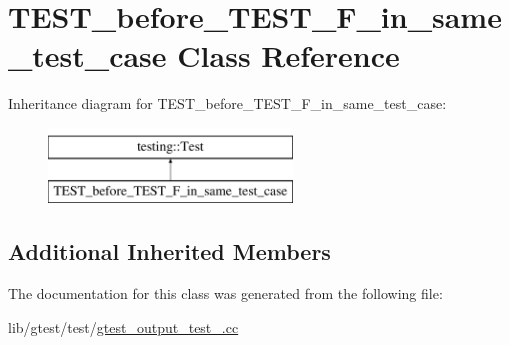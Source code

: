 \hypertarget{class_t_e_s_t__before___t_e_s_t___f__in__same__test__case}{\section{T\-E\-S\-T\-\_\-before\-\_\-\-T\-E\-S\-T\-\_\-\-F\-\_\-in\-\_\-same\-\_\-test\-\_\-case Class Reference}
\label{class_t_e_s_t__before___t_e_s_t___f__in__same__test__case}
}
Inheritance diagram for T\-E\-S\-T\-\_\-before\-\_\-\-T\-E\-S\-T\-\_\-\-F\-\_\-in\-\_\-same\-\_\-test\-\_\-case\-:\begin{figure}[H]
\begin{center}
\leavevmode
\includegraphics[height=2.000000cm]{class_t_e_s_t__before___t_e_s_t___f__in__same__test__case}
\end{center}
\end{figure}
\subsection*{Additional Inherited Members}


The documentation for this class was generated from the following file\-:\begin{DoxyCompactItemize}
\item 
lib/gtest/test/\hyperlink{gtest__output__test___8cc}{gtest\-\_\-output\-\_\-test\-\_\-.\-cc}\end{DoxyCompactItemize}
